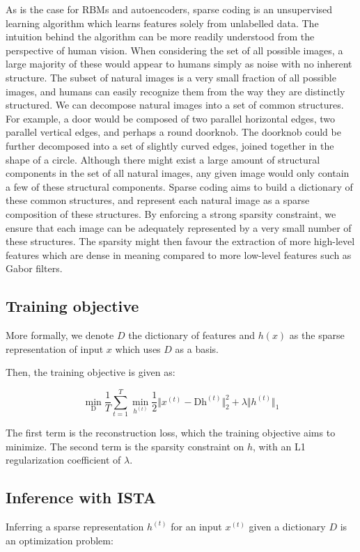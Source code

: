 \documentclass{article} %
\begin{document}
As is the case for RBMs and autoencoders, sparse coding is an unsupervised learning algorithm which learns features solely from unlabelled data. The intuition behind the algorithm can be more readily understood from the perspective of human vision. When considering the set of all possible images, a large majority of these would appear to humans simply as noise with no inherent structure. The subset of natural images is a very small fraction of all possible images, and humans can easily recognize them from the way they are distinctly structured. We can decompose natural images into a set of common structures. For example, a door would be composed of two parallel horizontal edges, two parallel vertical edges, and perhaps a round doorknob. The doorknob could be further decomposed into a set of slightly curved edges, joined together in the shape of a circle. Although there might exist a large amount of structural components in the set of all natural images, any given image would only contain a few of these structural components. Sparse coding aims to build a dictionary of these common structures, and represent each natural image as a sparse composition of these structures. By enforcing a strong sparsity constraint, we ensure that each image can be adequately represented by a very small number of these structures. The sparsity might then favour the extraction of more high-level features which are dense in meaning compared to more low-level features such as Gabor filters.

\subsection{Training objective}
More formally, we denote $D$ the dictionary of features and $h(x)$ as the sparse representation of input $x$ which uses $D$ as a basis.

Then, the training objective is given as:

\begin{equation}
\min_{\text{D}} \frac{1}{T} \sum_{t=1}^{T} \min_{h^{(t)}} \frac{1}{2} \Vert x^{(t)} - \text{D} \text{h}^{(t)} \Vert_{2}^{2} + \lambda \Vert h^{(t)} \Vert_{1}
\end{equation}

The first term is the reconstruction loss, which the training objective aims to minimize. The second term is the sparsity constraint on $h$, with an L1 regularization coefficient of $\lambda$.

\subsection{Inference with ISTA}
Inferring a sparse representation $h^{(t)}$ for an input $x^{(t)}$ given a dictionary $D$ is an optimization problem:
\end{document}
